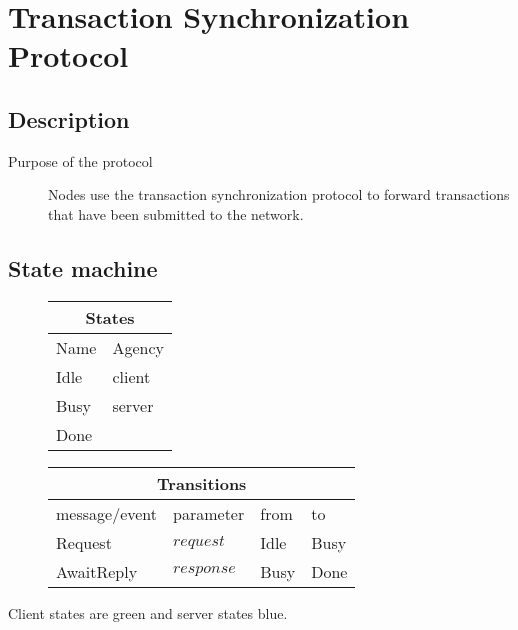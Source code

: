 \documentclass{report}
\newcommand{\hsref}[1]{} %
\theoremstyle{definition}{
  \newtheorem{lemma}{Lemma}[section] %
  \newtheorem{definition}[lemma]{Definition}
}
\theoremstyle{theorem}{
  \newtheorem{invariant}[lemma]{Invariant}
  \newtheorem{proofobligation}[lemma]{Proof Obligation}
}
\numberwithin{equation}{lemma}
\begin{document}
\section{Transaction Synchronization Protocol}
\subsection{Description}
\begin{description}
\item[Purpose of the protocol]
  Nodes use the transaction synchronization protocol to forward transactions that have been
  submitted to the network.
\end{description}

\subsection{State machine}
\hsref{ouroboros-network/src/Ouroboros/Network/Protocol/ReqResp/Type.hs}
\begin{figure}[H]
\begin{tabular}{|l|l|}
  \hline
  \multicolumn{2}{|c|}{States} \\ \hline
  Name  & Agency \\ \hline \hline
  Idle       & client \\ \hline
  Busy   & server \\ \hline
  Done       &        \\ \hline
  \hline
\end{tabular}
\end{figure}

\begin{figure}[H]
\begin{tabular}{|l|l|l|l|}
  \hline
  \multicolumn{4}{|c|}{Transitions} \\ \hline
  message/event      & parameter              & from        & to       \\ \hline\hline
  Request            & $request$              & Idle        & Busy      \\ \hline
  AwaitReply         & $response$             & Busy        & Done \\ \hline
\end{tabular}
\end{figure}

Client states are green and server states blue.

\begin{figure}[H]
\end{figure}
\end{document}
